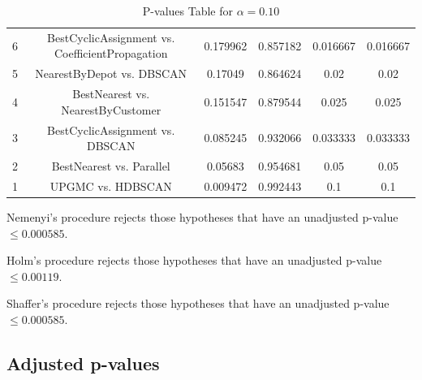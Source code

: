 \documentclass[a4paper,10pt]{article}
\begin{document}
\begin{landscape}
\begin{table}[!htp]
\begin{tabular}{cccccc}
6&BestCyclicAssignment vs. CoefficientPropagation&0.179962&0.857182&0.016667&0.016667\\
5&NearestByDepot vs. DBSCAN&0.17049&0.864624&0.02&0.02\\
4&BestNearest vs. NearestByCustomer&0.151547&0.879544&0.025&0.025\\
3&BestCyclicAssignment vs. DBSCAN&0.085245&0.932066&0.033333&0.033333\\
2&BestNearest vs. Parallel&0.05683&0.954681&0.05&0.05\\
1&UPGMC vs. HDBSCAN&0.009472&0.992443&0.1&0.1\\
\hline
\end{tabular}
\caption{P-values Table for $\alpha=0.10$}
\end{table}Nemenyi's procedure rejects those hypotheses that have an unadjusted p-value $\le0.000585$.

Holm's procedure rejects those hypotheses that have an unadjusted p-value $\le0.00119$.

Shaffer's procedure rejects those hypotheses that have an unadjusted p-value $\le0.000585$.

\pagebreak

\subsection{Adjusted p-values}


\end{landscape}
\end{document}
